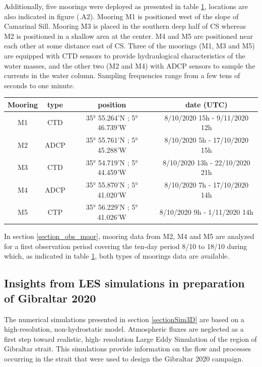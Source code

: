 Additionally, five moorings were deployed as presented in table \ref{tab_moor}, locations are also indicated in figure (.A2). Mooring M1 is positioned west of the slope of Camarinal Sill. Mooring M3 is placed in the southern deep half of CS whereas M2 is positioned in a shallow area at the center. M4 and M5 are positioned near each other at some distance east of CS. Three of the moorings (M1, M3 and M5) are equipped with CTD sensors to provide hydraulogical characteristics of the water masses, and the other two (M2 and M4) with ADCP sensors to sample the currents in the water column. Sampling frequencies range from a few tens of seconds to one minute.

\begin{table}[!h]
        \centering
        \begin{tabular}{|c|c|c|c|}
                \hline
                Mooring & type & position & date (UTC)\\ 
                 \hline
                M1 & CTD & 35° 55.264'N ; 5° 46.739'W & 8/10/2020 15h - 9/11/2020 12h\\
                M2 & ADCP & 35° 55.761'N ; 5° 45.288'W & 8/10/2020 5h - 17/10/2020 15h\\
                M3 & CTD & 35° 54.719'N ; 5° 44.459'W & 8/10/2020 13h - 22/10/2020 21h\\
                M4 & ADCP & 35° 55.870'N ; 5° 41.020'W & 8/10/2020 7h - 17/10/2020 14h\\
                M5 & CTP & 35° 56.229'N ; 5° 41.026'W & 8/10/2020 9h - 1/11/2020 14h\\
                \hline
        \end{tabular}
        \label{tab_moor}
\end{table}
In section \ref{section_obs_moor}, mooring data from M2, M4 and M5 are analyzed for a first observation period covering the ten-day period 8/10 to 18/10 during which, as indicated in table \ref{tab_moor}, both types of moorings data are available.


\subsection{Insights from LES simulations in preparation of Gibraltar 2020}

The numerical simulations presented in section \ref{sectionSim3D} are based on a high-resolution, non-hydrostatic model. Atmospheric fluxes are neglected as a first step toward realistic, high- resolution Large Eddy Simulation of the region of Gibraltar strait. This simulations provide information on the flow and processes occurring in the strait that were used to design the Gibraltar 2020 campaign.

